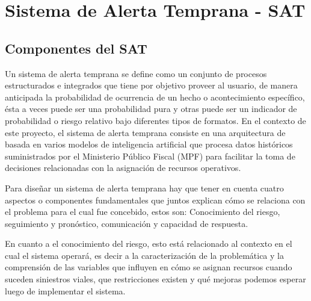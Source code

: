 \section{Sistema de Alerta Temprana - SAT}\label{sistema-de-alerta-temprana---sat}

\subsection{Componentes del SAT}\label{componentes-del-sat}

Un sistema de alerta temprana se define como un conjunto de procesos estructurados e integrados que tiene por objetivo proveer al usuario, de manera anticipada la probabilidad de ocurrencia de un hecho o acontecimiento específico, ésta a veces puede ser una probabilidad pura y otras puede ser un indicador de probabilidad o riesgo relativo bajo diferentes tipos de formatos. En el contexto de este proyecto, el sistema de alerta temprana consiste en una arquitectura de  basada en varios modelos de inteligencia artificial que procesa datos históricos suministrados por el Ministerio Público Fiscal (MPF) para facilitar la toma de decisiones relacionadas con la asignación de recursos operativos.

Para diseñar un sistema de alerta temprana hay que tener en cuenta cuatro aspectos o componentes fundamentales que juntos explican cómo se relaciona con el problema para el cual fue concebido, estos son: Conocimiento del riesgo, seguimiento y pronóstico, comunicación y capacidad de respuesta.

En cuanto a el conocimiento del riesgo, esto está relacionado al contexto en el cual el sistema operará, es decir a la caracterización de la problemática y la comprensión de las variables que influyen en cómo se asignan recursos cuando suceden siniestros viales, que restricciones existen y qué mejoras podemos esperar luego de implementar el sistema.

